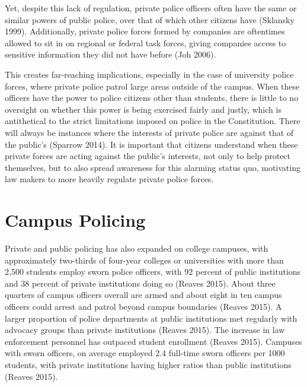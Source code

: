 \documentclass{ucetd}
\begin{document}
Yet, despite this lack of regulation, private police officers often have
the same or similar powers of public police, over that of which other
citizens have (Sklansky 1999). Additionally, private police forces
formed by companies are oftentimes allowed to sit in on regional or
federal task forces, giving companies access to sensitive information
they did not have before (Joh 2006).

This creates far-reaching implications, especially in the case of
university police forces, where private police patrol large areas
outside of the campus. When these officers have the power to police
citizens other than students, there is little to no oversight on whether
this power is being exercised fairly and justly, which is antithetical
to the strict limitations imposed on police in the Constitution. There
will always be instances where the interests of private police are
against that of the public's (Sparrow 2014). It is important that
citizens understand when these private forces are acting against the
public's interests, not only to help protect themselves, but to also
spread awareness for this alarming status quo, motivating law makers to
more heavily regulate private police forces.

\hypertarget{campus-policing}{%
\section{Campus Policing}\label{campus-policing}}

Private and public policing has also expanded on college campuses, with
approximately two-thirds of four-year colleges or universities with more
than 2,500 students employ sworn police officers, with 92 percent of
public institutions and 38 percent of private institutions doing so
(Reaves 2015). About three quarters of campus officers overall are armed
and about eight in ten campus officers could arrest and patrol beyond
campus boundaries (Reaves 2015). A larger proportion of police
departments at public institutions met regularly with advocacy groups
than private institutions (Reaves 2015). The increase in law enforcement
personnel has outpaced student enrollment (Reaves 2015). Campuses with
sworn officers, on average employed 2.4 full-time sworn officers per
1000 students, with private institutions having higher ratios than
public institutions (Reaves 2015).
\end{document}
